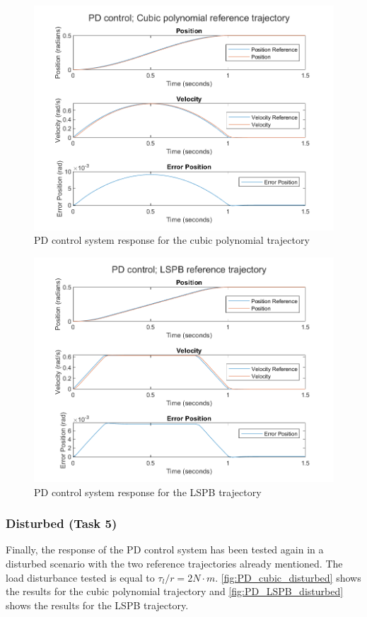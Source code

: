 \begin{figure}
    \centering
    \includegraphics[width=.7\textwidth]{PD_cubic.png}
    \caption{PD control system response for the cubic polynomial trajectory}
    \label{fig:PD_cubic}
\end{figure}

\begin{figure}
    \centering
    \includegraphics[width=.7\textwidth]{PD_LSPB.png}
    \caption{PD control system response for the LSPB trajectory}
    \label{fig:PD_LSPB}
\end{figure}

\subsubsection{Disturbed (Task 5)}
\label{subsubsec:pd-disturbed}
Finally, the response of the PD control system has been tested again in a
disturbed scenario with the two reference trajectories already mentioned. The
load disturbance tested is equal to $\tau_l/r = 2 N\cdot m$.
\autoref{fig:PD_cubic_disturbed} shows the results for the cubic polynomial
trajectory and \autoref{fig:PD_LSPB_disturbed} shows the results for the LSPB
trajectory.

